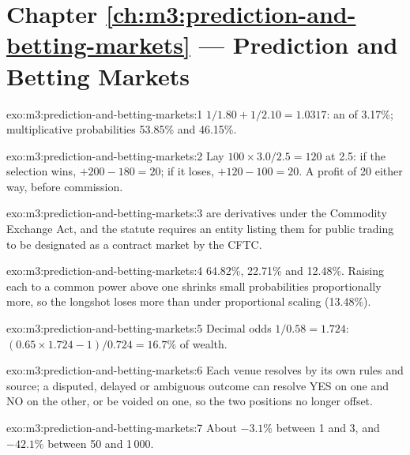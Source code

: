 \section*{Chapter \ref{ch:m3:prediction-and-betting-markets} --- Prediction and Betting Markets}

\begin{solution}{exo:m3:prediction-and-betting-markets:1}
$1/1.80 + 1/2.10 = 1.0317$: an  of 3.17\%; multiplicative probabilities 53.85\% and 46.15\%.
\end{solution}

\begin{solution}{exo:m3:prediction-and-betting-markets:2}
Lay $100 \times 3.0/2.5 = 120$ at 2.5: if the selection wins, $+200 - 180 = 20$; if it loses, $+120 - 100 = 20$. A profit of 20 either way, before
commission.
\end{solution}

\begin{solution}{exo:m3:prediction-and-betting-markets:3}
 are derivatives under the Commodity Exchange Act, and the statute requires an entity listing them for public trading to be designated as
a contract market by the CFTC.
\end{solution}

\begin{solution}{exo:m3:prediction-and-betting-markets:4}
64.82\%, 22.71\% and 12.48\%. Raising each  to a common power above one shrinks small probabilities proportionally more, so the
longshot loses more than under proportional scaling (13.48\%).
\end{solution}

\begin{solution}{exo:m3:prediction-and-betting-markets:5}
Decimal odds $1/0.58 = 1.724$: $(0.65 \times 1.724 - 1)/0.724 = 16.7\%$ of wealth.
\end{solution}

\begin{solution}{exo:m3:prediction-and-betting-markets:6}
Each venue resolves by its own rules and source; a disputed, delayed or ambiguous outcome can resolve YES on one and NO on the other, or be voided on one, so
the two positions no longer offset.
\end{solution}

\begin{solution}{exo:m3:prediction-and-betting-markets:7}
About $-3.1\%$ between 1 and 3, and $-42.1\%$ between 50 and 1\,000.
\end{solution}

